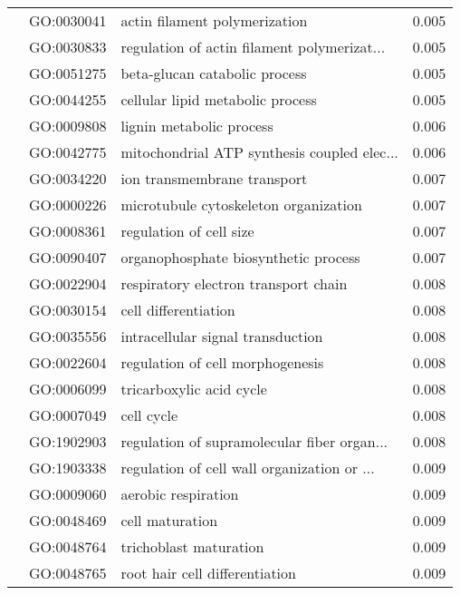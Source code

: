 \begin{longtable}{lllr}
   & GO:0030041 &                actin filament polymerization &         0.005 \\
   & GO:0030833 &  regulation of actin filament polymerizat... &         0.005 \\
   & GO:0051275 &                beta-glucan catabolic process &         0.005 \\
   & GO:0044255 &             cellular lipid metabolic process &         0.005 \\
   & GO:0009808 &                     lignin metabolic process &         0.006 \\
   & GO:0042775 &  mitochondrial ATP synthesis coupled elec... &         0.006 \\
   & GO:0034220 &                  ion transmembrane transport &         0.007 \\
   & GO:0000226 &        microtubule cytoskeleton organization &         0.007 \\
   & GO:0008361 &                      regulation of cell size &         0.007 \\
   & GO:0090407 &         organophosphate biosynthetic process &         0.007 \\
   & GO:0022904 &         respiratory electron transport chain &         0.008 \\
   & GO:0030154 &                         cell differentiation &         0.008 \\
   & GO:0035556 &            intracellular signal transduction &         0.008 \\
   & GO:0022604 &             regulation of cell morphogenesis &         0.008 \\
   & GO:0006099 &                     tricarboxylic acid cycle &         0.008 \\
   & GO:0007049 &                                   cell cycle &         0.008 \\
   & GO:1902903 &  regulation of supramolecular fiber organ... &         0.008 \\
   & GO:1903338 &  regulation of cell wall organization or ... &         0.009 \\
   & GO:0009060 &                          aerobic respiration &         0.009 \\
   & GO:0048469 &                              cell maturation &         0.009 \\
   & GO:0048764 &                       trichoblast maturation &         0.009 \\
   & GO:0048765 &               root hair cell differentiation &         0.009 \\

\end{longtable}
